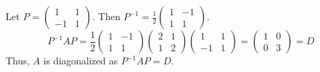 Let \(P = \begin{pmatrix} 1 & 1 \\ -1 & 1 \end{pmatrix}\). Then \(P^{-1} = \frac{1}{2} \begin{pmatrix} 1 & -1 \\ 1 & 1 \end{pmatrix}\).
    \[
    P^{-1}AP = \frac{1}{2} \begin{pmatrix} 1 & -1 \\ 1 & 1 \end{pmatrix} \begin{pmatrix} 2 & 1 \\ 1 & 2 \end{pmatrix} \begin{pmatrix} 1 & 1 \\ -1 & 1 \end{pmatrix} = \begin{pmatrix} 1 & 0 \\ 0 & 3 \end{pmatrix} = D
    \]
    Thus, \(A\) is diagonalized as \(P^{-1}AP = D\).
